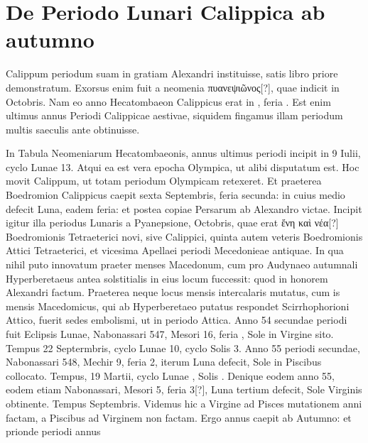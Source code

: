 \section{De Periodo Lunari Calippica ab autumno}
%
Calippum periodum suam in gratiam Alexandri instituisse,
satis libro priore demonstratum.
Exorsus enim fuit a neomenia
\textgreek{πυανεψιῶνος[?]}, quae indicit in  Octobris.
Nam eo anno
Hecatombaeon Calippicus erat in , feria .
Est enim ultimus
annus Periodi Calippicae aestivae, siquidem fingamus illam periodum
multis saeculis ante obtinuisse.
\begin{table}[htbp]
  
\end{table}
%
In Tabula Neomeniarum Hecatombaeonis,
annus ultimus periodi incipit in 9 Iulii, cyclo Lunae 13.
Atqui ea est vera epocha Olympica, ut alibi disputatum est.
Hoc
movit Calippum, ut totam periodum Olympicam retexeret.
Et
praeterea Boedromion Calippicus caepit sexta Septembris, feria secunda:
in cuius medio defecit Luna, eadem feria: et postea copiae
Persarum ab Alexandro victae.
Incipit igitur illa periodus Lunaris
a Pyanepsione,  Octobris, quae erat
 \textgreek{ἔνη καὶ νέα[?]} Boedromionis Tetraeterici
novi, sive Calippici, quinta autem veteris Boedromionis
Attici Tetraeterici, et vicesima Apellaei periodi Mecedonieae antiquae.
In qua nihil puto innovatum praeter menses Macedonum, cum
pro Audynaeo autumnali Hyperberetaeus antea solstitialis in eius
locum fuccessit: quod in honorem Alexandri factum.
Praeterea neque
locus mensis intercalaris mutatus, cum is mensis Macedomicus,
qui ab Hyperberetaeo putatus respondet Scirrhophorioni Attico,
fuerit sedes embolismi, ut in periodo Attica.
Anno 54 secundae periodi
fuit Eclipsis Lunae, Nabonassari 547, Mesori 16, feria , Sole
in Virgine sito.
Tempus 22 Septermbris, cyclo Lunae 10, cyclo
Solis 3.
Anno 55 periodi secundae, Nabonassari 548, Mechir 9,
feria 2, iterum Luna defecit, Sole in Piscibus collocato.
Tempus, 19
Martii, cyclo Lunae , Solis .
Denique eodem anno 55, eodem
etiam Nabonassari, Mesori 5, feria
3[?], Luna tertium defecit, Sole 
Virginis obtinente.
Tempus 
Septembris.
Videmus hic a Virgine
ad Pisces mutationem anni factam,
a Piscibus ad Virginem non
factam.
Ergo annus caepit ab Autumno:
et prionde periodi annus
